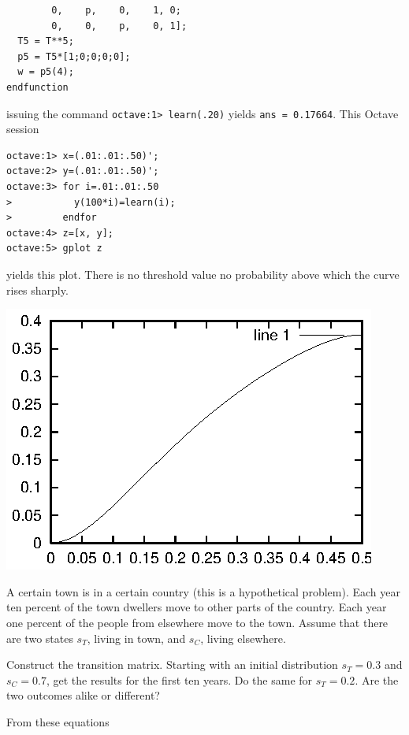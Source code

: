 \begin{exercises}
\begin{answer}
\begin{exparts}
\begin{lstlisting}
        0,    p,    0,    1, 0;
        0,    0,    p,    0, 1]; 
  T5 = T**5;
  p5 = T5*[1;0;0;0;0];
  w = p5(4);
endfunction
\end{lstlisting}
        issuing the command \texttt{octave:1> learn(.20)} yields
        \texttt{ans = 0.17664}.
       \partsitem This Octave session
\begin{lstlisting}
octave:1> x=(.01:.01:.50)';
octave:2> y=(.01:.01:.50)';
octave:3> for i=.01:.01:.50   
>           y(100*i)=learn(i);
>         endfor
octave:4> z=[x, y];
octave:5> gplot z
\end{lstlisting}
        yields this plot.
        There is no threshold value \Dash  no probability above which the
        curve rises sharply.
        \begin{center}
          \includegraphics[width=.55\textwidth]{map/pix/learn5.eps}
        \end{center}
      \end{exparts}
    \end{answer}
  \item 
     A certain town is in a certain country 
     (this is a hypothetical problem).
     Each year ten percent of the town dwellers move to other parts of 
     the country.
     Each year one percent of the people from elsewhere move to the town.
     Assume that there are two states $s_T$, living in town, and $s_C$,
     living elsewhere.
     \begin{exparts}
       \partsitem Construct the transition matrix.
       \partsitem Starting with an initial distribution $s_T=0.3$
         and $s_C=0.7$, get the results for the first ten years.
       \partsitem Do the same for $s_T=0.2$.
       \partsitem Are the two outcomes alike or different?
     \end{exparts}
     \begin{answer}
       \begin{exparts}
         \partsitem From these equations
           \begin{equation*}

\end{equation*}
\end{exparts}
\end{answer}
\end{exercises}
